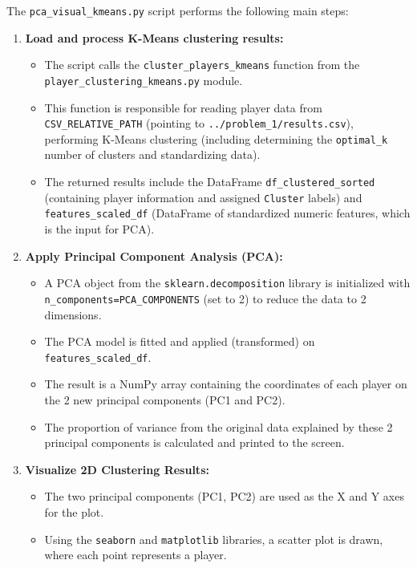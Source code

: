 \documentclass[12pt, a4paper]{report}
\begin{document}
The \texttt{pca\_visual\_kmeans.py} script performs the following main steps:
\begin{enumerate}[label=\textbf{Step \arabic*:}, leftmargin=*]
    \item \textbf{Load and process K-Means clustering results:}
    \begin{itemize}
        \item The script calls the \texttt{cluster\_players\_kmeans} function from the \texttt{player\_clustering\_kmeans.py} module.
        \item This function is responsible for reading player data from \texttt{CSV\_RELATIVE\_PATH} (pointing to \texttt{../problem\_1/results.csv}), performing K-Means clustering (including determining the \texttt{optimal\_k} number of clusters and standardizing data).
        \item The returned results include the DataFrame \texttt{df\_clustered\_sorted} (containing player information and assigned \texttt{Cluster} labels) and \texttt{features\_scaled\_df} (DataFrame of standardized numeric features, which is the input for PCA).
    \end{itemize}
    \item \textbf{Apply Principal Component Analysis (PCA):}
    \begin{itemize}
        \item A PCA object from the \texttt{sklearn.decomposition} library is initialized with \texttt{n\_components=PCA\_COMPONENTS} (set to 2) to reduce the data to 2 dimensions.
        \item The PCA model is fitted and applied (transformed) on \texttt{features\_scaled\_df}.
        \item The result is a NumPy array containing the coordinates of each player on the 2 new principal components (PC1 and PC2).
        \item The proportion of variance from the original data explained by these 2 principal components is calculated and printed to the screen.
    \end{itemize}
    \item \textbf{Visualize 2D Clustering Results:}
    \begin{itemize}
        \item The two principal components (PC1, PC2) are used as the X and Y axes for the plot.
        \item Using the \texttt{seaborn} and \texttt{matplotlib} libraries, a scatter plot is drawn, where each point represents a player.

\end{itemize}
\end{enumerate}
\end{document}
